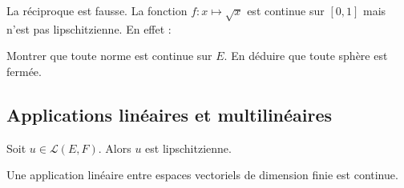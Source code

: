 \documentclass[a4paper,10pt]{report}
\begin{document}
\begin{rem} La réciproque est fausse. La fonction $f : x \mapsto \sqrt{x}$ est continue sur $[0,1]$ mais n'est pas lipschitzienne. En effet :

\vspace{6cm}
\end{rem}

\begin{exa} Montrer que toute norme est continue sur $E$. En déduire que toute sphère est fermée.
\end{exa}

\subsection{Applications linéaires et multilinéaires}

\begin{thm} Soit $u \in \mathcal{L}(E,F)$. Alors $u$ est lipschitzienne.
\end{thm}

\begin{preuve} 

\vspace{9cm}
\end{preuve}


\begin{cor} Une application linéaire entre espaces vectoriels de dimension finie est continue.
\end{cor}
\end{document}
